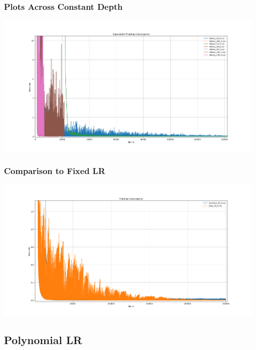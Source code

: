 \documentclass[a4paper, 12pt]{report}
\def\size{0.39}
\begin{document}
\begin{center}
\subsubsection{Plots Across Constant Depth}

\includegraphics[scale=\size]{Expo_Cons_D.png}
\subsubsection{Comparison to Fixed LR}

\includegraphics[scale=\size]{Comparison_Expo.png}

\subsection{Polynomial LR}

\end{center}
\end{document}
